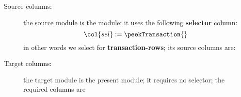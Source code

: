 \begin{description}
	\item[Source columns:] the source module is the \hubMod{} module; it uses the following \textbf{selector} column:
		\[
			\col{sel} := \peekTransaction{}
		\]
		in other words we select for \textbf{transaction-rows}; its source columns are:
		\begin{multicols}{3}
			\begin{enumerate}
					\lookupColumnsHubIntoTxnData{}					%
			\end{enumerate}
		\end{multicols}
	\item[Target columns:] the target module is the present \userTxnDataMod{} module; it requires no selector; the required columns are
		\begin{multicols}{3}
			\begin{enumerate}
					\lookupColumnsHubIntoTxnData{}					%
			\end{enumerate}
		\end{multicols}
\end{description}

